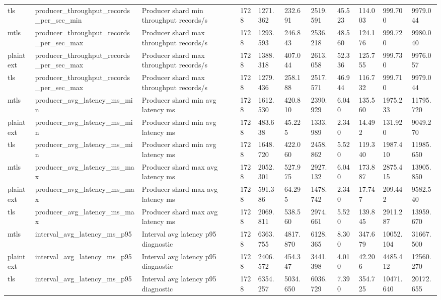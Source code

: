 \begin{longtable}{lllllllllll}
tls & producer\_throughput\_records\_per\_sec\_min & Producer shard min throughput records/s & 1728 & 1271.362 & 232.691 & 2519.591 & 45.523 & 114.003 & 999.700 & 9979.044 \\
mtls & producer\_throughput\_records\_per\_sec\_max & Producer shard max throughput records/s & 1728 & 1293.593 & 246.843 & 2536.218 & 48.560 & 124.176 & 999.720 & 9980.040 \\
plaintext & producer\_throughput\_records\_per\_sec\_max & Producer shard max throughput records/s & 1728 & 1388.318 & 407.044 & 2613.058 & 52.336 & 125.755 & 999.730 & 9976.057 \\
tls & producer\_throughput\_records\_per\_sec\_max & Producer shard max throughput records/s & 1728 & 1279.436 & 258.188 & 2517.571 & 46.944 & 116.732 & 999.710 & 9979.044 \\
mtls & producer\_avg\_latency\_ms\_min & Producer shard min avg latency ms & 1728 & 1612.530 & 420.810 & 2390.929 & 6.040 & 135.560 & 1975.233 & 11795.720 \\
plaintext & producer\_avg\_latency\_ms\_min & Producer shard min avg latency ms & 1728 & 483.638 & 45.225 & 1333.989 & 2.340 & 14.492 & 131.920 & 9049.270 \\
tls & producer\_avg\_latency\_ms\_min & Producer shard min avg latency ms & 1728 & 1648.720 & 422.060 & 2458.862 & 5.520 & 119.340 & 1987.410 & 11985.650 \\
mtls & producer\_avg\_latency\_ms\_max & Producer shard max avg latency ms & 1728 & 2052.301 & 527.975 & 2927.132 & 6.040 & 173.887 & 2875.415 & 13905.850 \\
plaintext & producer\_avg\_latency\_ms\_max & Producer shard max avg latency ms & 1728 & 591.386 & 64.295 & 1478.742 & 2.340 & 17.747 & 209.442 & 9582.540 \\
tls & producer\_avg\_latency\_ms\_max & Producer shard max avg latency ms & 1728 & 2069.811 & 538.560 & 2974.661 & 5.520 & 139.845 & 2911.287 & 13959.670 \\
mtls & interval\_avg\_latency\_ms\_p95 & Interval avg latency p95 diagnostic & 1728 & 6363.755 & 4817.870 & 6128.365 & 8.300 & 347.679 & 10052.104 & 31667.500 \\
plaintext & interval\_avg\_latency\_ms\_p95 & Interval avg latency p95 diagnostic & 1728 & 2406.572 & 454.347 & 3441.398 & 4.010 & 42.206 & 4485.412 & 12560.270 \\
tls & interval\_avg\_latency\_ms\_p95 & Interval avg latency p95 diagnostic & 1728 & 6354.257 & 5034.650 & 6036.729 & 7.390 & 354.725 & 10471.640 & 20172.655 \\

\end{longtable}
